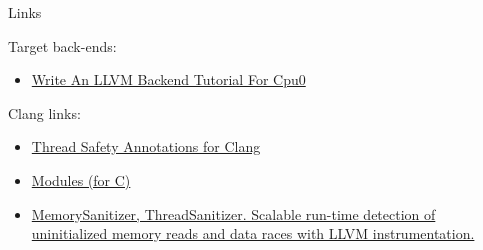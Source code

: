 \documentclass[8pt]{beamer}
\begin{document}
\begin{frame}{Links}
  \begin{block}{Target back-ends:}
    \begin{itemize}
      \item \href{http://jonathan2251.github.com/lbd/}{Write An LLVM Backend Tutorial For Cpu0}
    \end{itemize}
  \end{block}

  \begin{block}{Clang links:}
    \begin{itemize}
      \item
        \href{http://llvm.org/devmtg/2011-11/Hutchins_ThreadSafety.pdf}{Thread
          Safety Annotations for Clang}
      \item \href{http://llvm.org/devmtg/2012-11/Gregor-Modules.pdf}{Modules
          (for C)}
      \item
        \href{http://llvm.org/devmtg/2012-11/Serebryany_TSan-MSan.pdf}{MemorySanitizer,
          ThreadSanitizer. Scalable run-time detection of uninitialized memory
          reads and data races with LLVM instrumentation.}
    \end{itemize}
  \end{block}
\end{frame}
\end{document}
